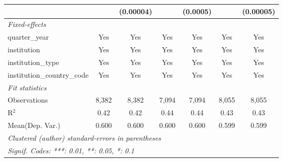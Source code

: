 \begin{tabular}{lcccccc}
                                      &               & (0.00004)     &              & (0.0005)     &              & (0.00005)\\   
   \midrule
   \emph{Fixed-effects}\\
   quarter\_year                      & Yes           & Yes           & Yes          & Yes          & Yes          & Yes\\  
   institution                        & Yes           & Yes           & Yes          & Yes          & Yes          & Yes\\  
   institution\_type                  & Yes           & Yes           & Yes          & Yes          & Yes          & Yes\\  
   institution\_country\_code         & Yes           & Yes           & Yes          & Yes          & Yes          & Yes\\  
   \midrule
   \emph{Fit statistics}\\
   Observations                       & 8,382         & 8,382         & 7,094        & 7,094        & 8,055        & 8,055\\  
   R$^2$                              & 0.42          & 0.42          & 0.44         & 0.44         & 0.43         & 0.43\\  
Mean(Dep. Var.) & 0.600 & 0.600 & 0.600 & 0.600 & 0.599 & 0.599 \\
   \midrule \midrule
   \multicolumn{7}{l}{\emph{Clustered (author) standard-errors in parentheses}}\\
   \multicolumn{7}{l}{\emph{Signif. Codes: ***: 0.01, **: 0.05, *: 0.1}}\\
\end{tabular}
\par\endgroup

